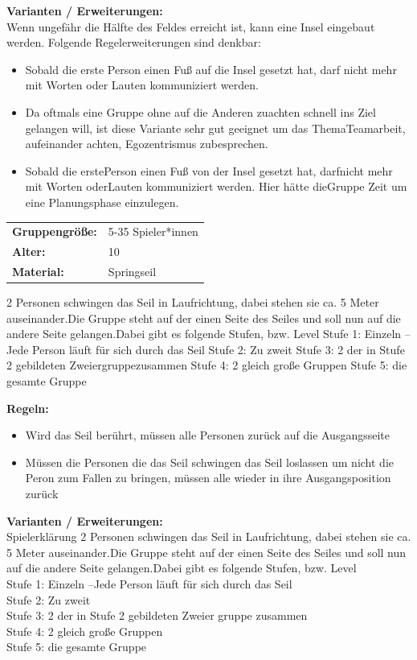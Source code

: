 \textbf{Varianten / Erweiterungen:}\\
Wenn ungefähr die Hälfte des Feldes erreicht ist, kann eine Insel eingebaut werden. Folgende Regelerweiterungen sind denkbar:
\begin{itemize}
    \item  Sobald die erste Person einen Fuß auf die Insel gesetzt hat, darf nicht mehr mit Worten oder Lauten kommuniziert werden.
    \item Da oftmals eine Gruppe ohne auf die Anderen zuachten schnell ins Ziel gelangen will, ist diese Variante sehr gut geeignet um das ThemaTeamarbeit, aufeinander achten, Egozentrismus zubesprechen.
    \item Sobald die erstePerson einen Fuß von der Insel gesetzt hat, darfnicht mehr mit Worten oderLauten kommuniziert werden. Hier hätte dieGruppe Zeit um eine Planungsphase einzulegen.
\end{itemize}
\newpage
\begin{table}[H]
\begin{tabular}{>{\bfseries}lp{8cm}}
   Gruppengröße:   & 5-35 Spieler*innen\\
    Alter: & 10 \\
    Material: & Springseil \\ 
\end{tabular}
\end{table} 
2 Personen schwingen das Seil in Laufrichtung, dabei stehen sie ca. 5 Meter auseinander.Die Gruppe steht auf der einen Seite des Seiles und soll nun auf die andere Seite gelangen.Dabei gibt es folgende Stufen, bzw. Level
Stufe 1: Einzeln –Jede Person läuft für sich durch das Seil
Stufe 2: Zu zweit
Stufe 3: 2 der in Stufe 2 gebildeten Zweiergruppezusammen
Stufe 4: 2 gleich große Gruppen
Stufe 5: die gesamte Gruppe

\textbf{Regeln:}
\begin{itemize}
    \item Wird das Seil berührt, müssen alle Personen zurück auf die Ausgangsseite
    \item Müssen die Personen die das Seil schwingen das Seil loslassen um nicht die Peron zum Fallen zu bringen, müssen alle wieder in ihre Ausgangsposition zurück
\end{itemize}
\textbf{Varianten / Erweiterungen:}\\
Spielerklärung
2 Personen schwingen das Seil in Laufrichtung, dabei stehen sie ca. 5 Meter auseinander.Die Gruppe steht auf der einen Seite des Seiles und soll nun auf die andere Seite gelangen.Dabei gibt es folgende Stufen, bzw. Level\\
Stufe 1: Einzeln –Jede Person läuft für sich durch das Seil\\
Stufe 2: Zu zweit\\
Stufe 3: 2 der in Stufe 2 gebildeten Zweier gruppe zusammen\\
Stufe 4: 2 gleich große Gruppen\\
Stufe 5: die gesamte Gruppe\\

